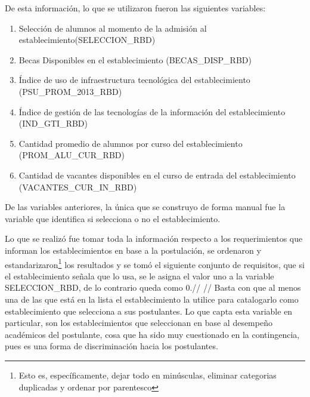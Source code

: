 De esta información, lo que se utilizaron fueron las siguientes variables:
\begin{enumerate}
\item Selección de alumnos al momento de la admisión al establecimiento(SELECCION\_RBD)
\item Becas Disponibles en el establecimiento (BECAS\_DISP\_RBD)
\item Índice de uso de infraestructura tecnológica del establecimiento (PSU\_PROM\_2013\_RBD)
\item Índice de gestión de las tecnologías de la información del establecimiento (IND\_GTI\_RBD)
\item Cantidad promedio de alumnos por curso del establecimiento (PROM\_ALU\_CUR\_RBD)
\item Cantidad de vacantes disponibles en el curso de entrada del establecimiento (VACANTES\_CUR\_IN\_RBD)
\end{enumerate}

De las variables anteriores, la única que se construyo de forma manual fue la variable que identifica si selecciona o no el establecimiento.

Lo que se realizó fue tomar toda la información respecto a los requerimientos que informan los establecimientos en base a la postulación, se ordenaron y estandarizaron\footnote{Esto es, específicamente, dejar todo en minúsculas, eliminar categorias duplicadas y ordenar por parentesco} los resultados y se tomó el siguiente conjunto de requisitos, que si el establecimiento señala que lo usa, se le asigna el valor uno a la variable SELECCION\_RBD, de lo contrario queda como 0.//
\noindent{}//
Basta con que al menos una de las que está en la lista el establecimiento la utilice para catalogarlo como establecimiento que selecciona a sus postulantes. Lo que capta esta variable en particular, son los establecimientos que seleccionan en base al desempeño académicos del postulante, cosa que ha sido muy cuestionado en la contingencia, pues es una forma de discriminación hacia los postulantes.